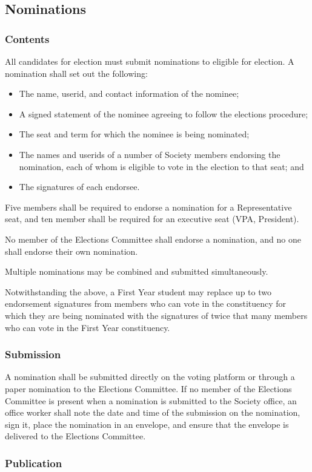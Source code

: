 \subsection{Nominations}
\subsubsection{Contents}
All candidates for election must submit nominations to eligible for election.
A nomination shall set out the following:
\begin{itemize}
	\item The name, userid, and contact information of the nominee;
	\item A signed statement of the nominee agreeing to follow the elections procedure;
	\item The seat and term for which the nominee is being nominated;
	\item The names and userids of a number of Society members endorsing the nomination, each of whom is eligible to vote in the election to that seat; and
	\item The signatures of each endorsee.
\end{itemize}
Five members shall be required to endorse a nomination for a Representative seat, and ten member shall be required for an executive seat (VPA, President). 

No member of the Elections Committee shall endorse a nomination, and no one shall endorse their own nomination.

Multiple nominations may be combined and submitted simultaneously.

Notwithstanding the above, a First Year student may replace up to two endorsement signatures from members who can vote in the constituency for which they are being nominated with the signatures of twice that many members who can vote in the First Year constituency.
\subsubsection{Submission}
A nomination shall be submitted directly on the voting platform or through a paper nomination to the Elections Committee.
If no member of the Elections Committee is present when a nomination is submitted to the Society office, an office worker shall note the date and time of the submission on the nomination, sign it, place the nomination in an envelope, and ensure that the envelope is delivered to the Elections Committee.

\subsubsection{Publication}

